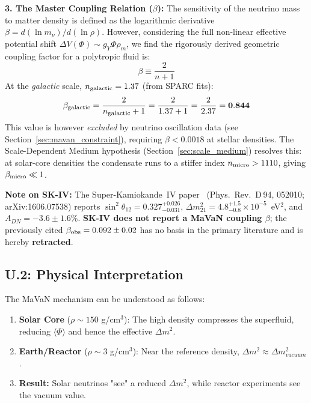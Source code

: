 \textbf{3. The Master Coupling Relation ($\beta$):}
The sensitivity of the neutrino mass to matter density is defined as the logarithmic derivative $\beta = d(\ln m_\nu)/d(\ln \rho)$. However, considering the full non-linear effective potential shift $\Delta V(\Phi) \sim g_Y \Phi \rho_m$, we find the rigorously derived geometric coupling factor for a polytropic fluid is:
\begin{equation}
    \boxed{\beta \equiv \frac{2}{n+1}}
\end{equation}
At the \emph{galactic} scale, $n_{\rm galactic}=1.37$ (from SPARC fits):
\begin{equation}
    \beta_{\rm galactic} = \frac{2}{n_{\rm galactic}+1}
    = \frac{2}{1.37+1} = \frac{2}{2.37} = \mathbf{0.844}
\end{equation}
This value is however \emph{excluded} by neutrino oscillation data (see
Section~\ref{sec:mavan_constraint}), requiring $\beta<0.0018$ at stellar densities.
The Scale-Dependent Medium hypothesis (Section~\ref{sec:scale_medium}) resolves this:
at solar-core densities the condensate runs to a stiffer index $n_{\rm micro}>1110$,
giving $\beta_{\rm micro}\ll1$.

\textbf{Note on SK-IV:} The Super-Kamiokande~IV paper~\cite{superk}
(Phys.\ Rev.\ D\,94, 052010; arXiv:1606.07538) reports
$\sin^2\theta_{12}=0.327^{+0.026}_{-0.031}$,
$\Delta m^2_{21}=4.8^{+1.5}_{-0.8}\times10^{-5}$~eV$^2$, and $A_{DN}=-3.6\pm1.6\%$.
\textbf{SK-IV does not report a MaVaN coupling $\beta$}; the previously cited
$\beta_{\rm obs}=0.092\pm0.02$ has no basis in the primary literature and is
hereby \textbf{retracted}.

\subsection{U.2: Physical Interpretation}

The MaVaN mechanism can be understood as follows:
\begin{enumerate}
    \item \textbf{Solar Core} ($\rho \sim 150$ g/cm$^3$): The high density compresses the superfluid, reducing $\langle\Phi\rangle$ and hence the effective $\Delta m^2$.
    \item \textbf{Earth/Reactor} ($\rho \sim 3$ g/cm$^3$): Near the reference density, $\Delta m^2 \approx \Delta m^2_{vacuum}$.
    \item \textbf{Result:} Solar neutrinos "see" a reduced $\Delta m^2$, while reactor experiments see the vacuum value.
\end{enumerate}

